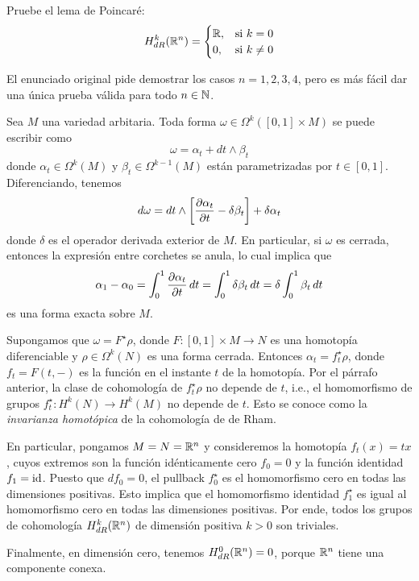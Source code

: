 \begin{exercise}
Pruebe el lema de Poincaré:
$$
H_{dR}^k(\mathbb R^n) =
    \begin{cases}
        \mathbb R, & \text{si } k = 0 \\
        0, & \text{si } k \ne 0
    \end{cases}
$$
\end{exercise}

\begin{remark}
El enunciado original pide demostrar los casos $n = 1,2,3,4$, pero es más fácil dar una única prueba válida para todo $n \in \mathbb N$.
\end{remark}

\begin{solution}
Sea $M$ una variedad arbitaria. Toda forma $\omega \in \Omega^k([0,1] \times M)$ se puede escribir como
$$\omega = \alpha_t + dt \wedge \beta_t$$
donde $\alpha_t \in \Omega^k(M)$ y $\beta_t \in \Omega^{k-1}(M)$ están parametrizadas por $t \in [0,1]$. Diferenciando, tenemos
$$d\omega = dt \wedge \left[ \frac {\partial \alpha_t} {\partial t} - \delta \beta_t \right] + \delta \alpha_t$$
donde $\delta$ es el operador derivada exterior de $M$. En particular, si $\omega$ es cerrada, entonces la expresión entre corchetes se anula, lo cual implica que
$$\alpha_1 - \alpha_0 = \int_0^1 \frac {\partial \alpha_t} {\partial t} \, dt = \int_0^1 \delta \beta_t \, dt = \delta \int_0^1 \beta_t \, dt$$
es una forma exacta sobre $M$.

Supongamos que $\omega = F^\star \rho$, donde $F : [0,1] \times M \to N$ es una homotopía diferenciable y $\rho \in \Omega^k(N)$ es una forma cerrada. Entonces $\alpha_t = f_t^\star \rho$, donde $f_t = F(t,-)$ es la función en el instante $t$ de la homotopía. Por el párrafo anterior, la clase de cohomología de $f_t^\star \rho$ no depende de $t$, i.e., el homomorfismo de grupos $f_t^\star : H^k(N) \to H^k(M)$ no depende de $t$. Esto se conoce como la \textit{invarianza homotópica} de la cohomología de de Rham.

En particular, pongamos $M = N = \mathbb R^n$ y consideremos la homotopía $f_t(x) = tx$, cuyos extremos son la función idénticamente cero $f_0 = 0$ y la función identidad $f_1 = \operatorname{id}$. Puesto que $df_0 = 0$, el pullback $f_0^\star$ es el homomorfismo cero en todas las dimensiones positivas. Esto implica que el homomorfismo identidad $f_1^\star$ es igual al homomorfismo cero en todas las dimensiones positivas. Por ende, todos los grupos de cohomología $H_{dR}^k(\mathbb R^n)$ de dimensión positiva $k > 0$ son triviales.

Finalmente, en dimensión cero, tenemos $H_{dR}^0(\mathbb R^n) = 0$, porque $\mathbb R^n$ tiene una componente conexa.
\end{solution}
